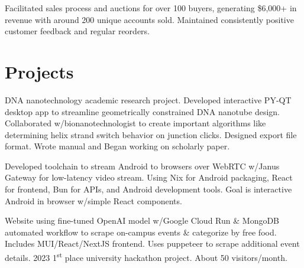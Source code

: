 \documentclass[letterpaper, 10pt]{article}
\begin{document}
{Facilitated sales process and auctions for over 100 buyers, generating \$6,000+ in revenue with around 200 unique accounts sold. Maintained consistently positive customer feedback and regular reorders.}
\resumeItemListEnd

\resumeSubHeadingListEnd

\vspace{-16pt}

\section{Projects}
\resumeSubHeadingListStart
{}
{DNA nanotechnology academic research project. Developed interactive PY-QT desktop app to streamline geometrically constrained DNA nanotube design. Collaborated w/bionanotechnologist to create important algorithms like determining helix strand switch behavior on junction clicks. Designed export file format. Wrote manual and Began working on scholarly paper.}


{Developed toolchain to stream Android to browsers over WebRTC w/Janus Gateway for low-latency video stream. Using Nix for Android packaging, React for frontend, Bun for APIs, and Android development tools. Goal is interactive Android in browser w/simple React components.}

{Website using fine-tuned OpenAI model w/Google Cloud Run \& MongoDB automated workflow to scrape on-campus events \& categorize by free food. Includes MUI/React/NextJS frontend. Uses puppeteer to scrape additional event details. 2023 1\textsuperscript{st} place university hackathon project. About 50 visitors/month.}
\resumeSubHeadingListEnd
\end{document}
